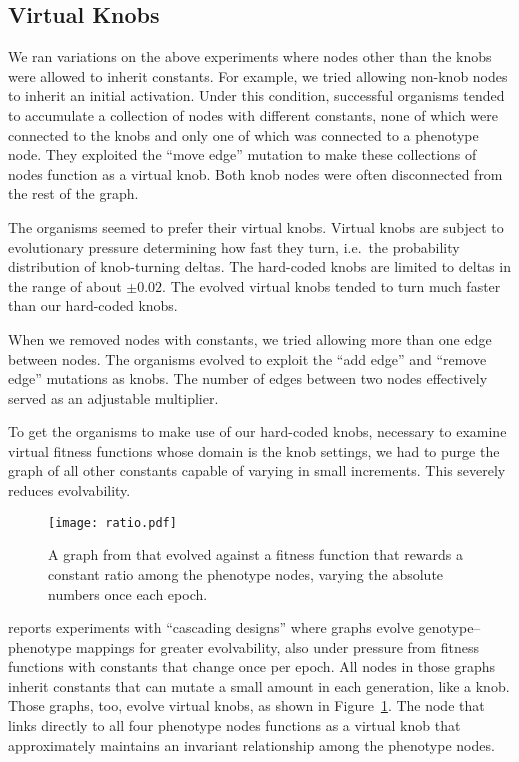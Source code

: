 \documentclass[letterpaper]{article}
\begin{document}
\subsection{Virtual Knobs}

We ran variations on the above experiments where nodes other than the knobs were
allowed to inherit constants. For example, we tried allowing non-knob nodes to
inherit an initial activation. Under this condition, successful organisms tended
to accumulate a collection of nodes with different constants, none of which were
connected to the knobs and only one of which was connected to a phenotype node.
They exploited the ``move edge'' mutation to make these collections of nodes
function as a virtual knob. Both knob nodes were often disconnected from the
rest of the graph.

The organisms seemed to prefer their virtual knobs. Virtual knobs are subject to
evolutionary pressure determining how fast they turn, i.e.~the probability
distribution of knob-turning deltas. The hard-coded knobs are limited to deltas
in the range of about $\pm0.02$. The evolved virtual knobs tended to turn much
faster than our hard-coded knobs.

When we removed nodes with constants, we tried allowing more than one edge
between nodes. The organisms evolved to exploit the ``add edge'' and ``remove
edge'' mutations as knobs. The number of edges between two nodes effectively
served as an adjustable multiplier.

To get the organisms to make use of our hard-coded knobs, necessary to examine
virtual fitness functions whose domain is the knob settings, we had to purge
the graph of all other constants capable of varying in small increments. This
severely reduces evolvability.

\begin{figure}[b]
  \centering
  \texttt{[image: ratio.pdf]}
  \caption{A graph from \citet{kovitz2015experiments} that evolved against a
    fitness function that rewards a constant ratio among the phenotype nodes,
  varying the absolute numbers once each epoch.}
  \label{fig:virtual-knob}
\end{figure}

\citet{kovitz2015experiments} reports experiments with ``cascading designs''
where graphs evolve genotype--phenotype mappings for greater evolvability, also
under pressure from fitness functions with constants that change once per epoch.
All nodes in those graphs inherit constants that can mutate a small amount in
each generation, like a knob. Those graphs, too, evolve virtual knobs, as shown
in Figure~\ref{fig:virtual-knob}. The node that links directly to all four phenotype nodes functions
as a virtual knob that approximately maintains an invariant relationship
among the phenotype nodes.
\end{document}
